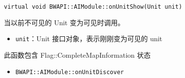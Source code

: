 \begin{tcolorbox}[colback=white, colframe=black!60!white, title=onUnitShow(), arc=0mm]
\begin{verbatim}
virtual void BWAPI::AIModule::onUnitShow(Unit unit)
\end{verbatim}
当以前不可见的 Unit 变为可见时调用。
\begin{parameter}
    \begin{itemize}
        \item \texttt{unit}：Unit 接口对象，表示刚刚变为可见的 unit
    \end{itemize}
\end{parameter}
\begin{note}
    此函数包含 Flag::CompleteMapInformation 状态
\end{note}
\begin{refer}
    \begin{itemize}
        \item \texttt{BWAPI::AIModule::onUnitDiscover}
    \end{itemize}
\end{refer}
\end{tcolorbox}

